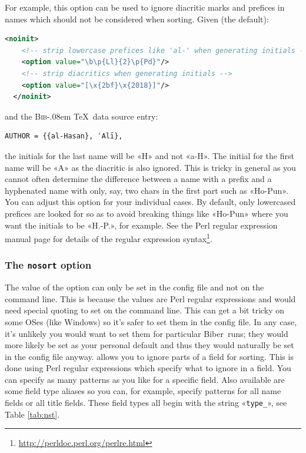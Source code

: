 \documentclass{ltxdockit}
\def\BibTeX{\textsc{Bib}\kern-.08em \TeX}
\newcommand*{\biber}{Biber\xspace}
\begin{document}
For example, this option can be used to ignore diacritic marks and prefices
in names which should not be considered when sorting. Given (the default):

\begin{lstlisting}[language=xml]
  <noinit>
    <!-- strip lowercase prefices like 'al-' when generating initials -->
    <option value="\b\p{Ll}{2}\p{Pd}"/>
    <!-- strip diacritics when generating initials -->
    <option value="[\x{2bf}\x{2018}]"/>
  </noinit>
\end{lstlisting}

\noindent and the \BibTeX\ data source entry:

\begin{verbatim}
AUTHOR = {{al-Hasan}, ʿAlī},
\end{verbatim}

\noindent the initials for the last name will be «H» and not «a-H». The
initial for the first name will be «A» as the diacritic is also ignored.
This is tricky in general as you cannot often determine the difference
between a name with a prefix and a hyphenated name with only, say, two
chars in the first part such as «Ho-Pun». You can adjust this option for
your individual cases. By default, only lowercased prefices are looked for
so as to avoid breaking things like «Ho-Pun» where you want the initials to
be «H.-P.», for example. See the Perl regular expression manual page for
details of the regular expression
syntax\footnote{\url{http://perldoc.perl.org/perlre.html}}.

\subsubsection{The \texttt{nosort} option}\label{nosort}

The value of the  option can only be set in the config file
and not on the command line. This is because the values are Perl regular
expressions and would need special quoting to set on the command line. This
can get a bit tricky on some OSes (like Windows) so it's safer to set them
in the config file. In any case, it's unlikely you would want to set them
for particular \biber\ runs; they would more likely be set as your
personal default and thus they would naturally be set in the config file
anyway.  allows you to ignore parts of a field for sorting.
This is done using Perl regular expressions which specify what to
ignore in a field. You can specify as many patterns as you like for a
specific field. Also available are some field type aliases so you can, for
example, specify patterns for all name fields or all title fields. These
field types all begin with the string «\verb+type_+», see Table
\ref{tab:nst}.
\end{document}
